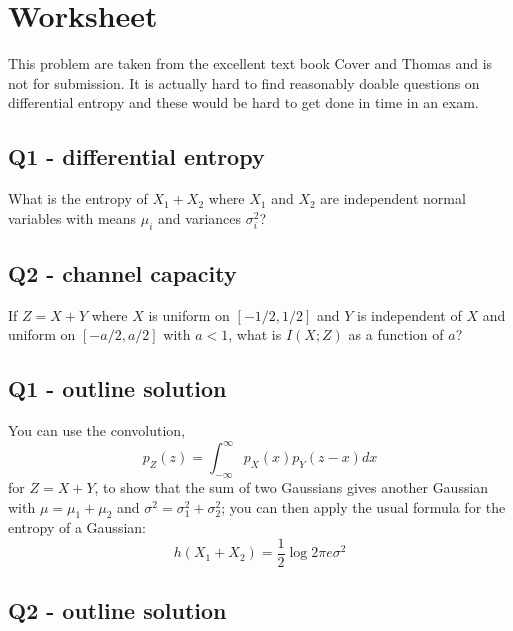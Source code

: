 \documentclass[12pt]{article}
\begin{document}
\section*{Worksheet} 

This problem are taken from the excellent text book Cover and Thomas
and is not for submission. It is actually hard to find reasonably
doable questions on differential entropy and these would be hard to
get done in time in an exam.

\subsection*{Q1 - differential entropy}

What is the entropy of $X_1+X_2$ where $X_1$ and $X_2$ are independent normal variables with means $\mu_i$ and variances $\sigma_i^2$?



\subsection*{Q2 - channel capacity}

If $Z=X+Y$ where $X$ is uniform on $[-1/2,1/2]$ and $Y$ is independent of $X$ and uniform on $[-a/2,a/2]$ with $a<1$, what is $I(X;Z)$ as a function of $a$?

\newpage

\subsection*{Q1 - outline solution}

You can use the convolution,
\begin{equation}
  p_Z(z)=\int_{-\infty}^\infty p_X(x)p_Y(z-x)dx
\end{equation}
for $Z=X+Y$, to show that the sum of two Gaussians gives another Gaussian with $\mu=\mu_1+\mu_2$ and $\sigma^2=\sigma_1^2+\sigma_2^2$; you can then apply the usual formula for the entropy of a Gaussian:
\begin{equation}
  h(X_1+X_2)=\frac{1}{2}\log{2\pi e \sigma^2}
\end{equation}

\subsection*{Q2 - outline solution}
\end{document}

